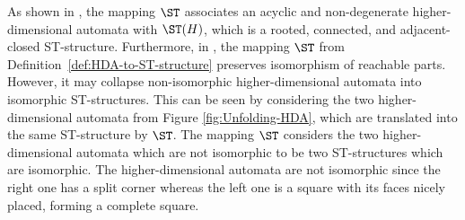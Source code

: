     As shown in \cite[Proposition 3.42]{Johansen16STstruct}, the mapping $\ST$ associates an acyclic and non-degenerate higher-dimensional automata with $\ST(H)$, which is a rooted, connected, and adjacent-closed ST-structure. Furthermore, in \cite[Proposition 3.44]{Johansen16STstruct}, the mapping $\ST$ from Definition~\ref{def:HDA-to-ST-structure} preserves isomorphism of reachable parts. However, it may collapse non-isomorphic higher-dimensional automata into isomorphic ST-structures. This can be seen by considering the two higher-dimensional automata from Figure \ref{fig:Unfolding-HDA}, which are translated into the same ST-structure by $\ST$. The mapping $\ST$ considers the two higher-dimensional automata which are not isomorphic to be two ST-structures which are isomorphic. The higher-dimensional automata are not isomorphic since the right one has a split corner whereas the left one is a square with its faces nicely placed, forming a complete square. 
    
    
        
        
